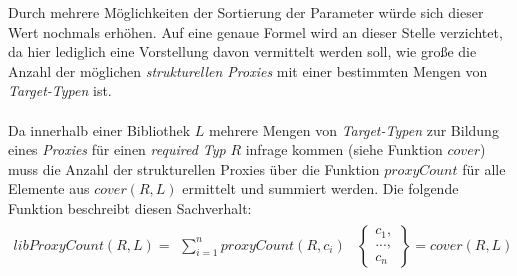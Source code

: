 \noindent
Durch mehrere Möglichkeiten der Sortierung der Parameter würde sich dieser Wert nochmals erhöhen. Auf eine genaue Formel wird an dieser Stelle verzichtet, da hier lediglich eine Vorstellung davon vermittelt werden soll, wie große die Anzahl der möglichen \emph{strukturellen Proxies} mit einer bestimmten Mengen von \emph{Target-Typen} ist.
\\\\
Da innerhalb einer Bibliothek $L$ mehrere Mengen von \emph{Target-Typen} zur Bildung eines \emph{Proxies} für einen \emph{required Typ} $R$ infrage kommen (siehe Funktion $\mathit{cover}$) muss die Anzahl der strukturellen Proxies über die Funktion $\mathit{proxyCount}$ für alle Elemente aus $\mathit{cover(R,L)}$ ermittelt und summiert werden. Die folgende Funktion beschreibt diesen Sachverhalt:
\begin{gather*}
\mathit{libProxyCount(R,L)} = 
\begin{array}{l|l}
\sum_{i=1}^{n}\mathit{proxyCount(R,c_i)}
&
\left\{
\begin{array}{l}
c_1,\\
...,\\
c_n
\end{array}
\right\} = \mathit{cover(R,L)}
\end{array}
\end{gather*}